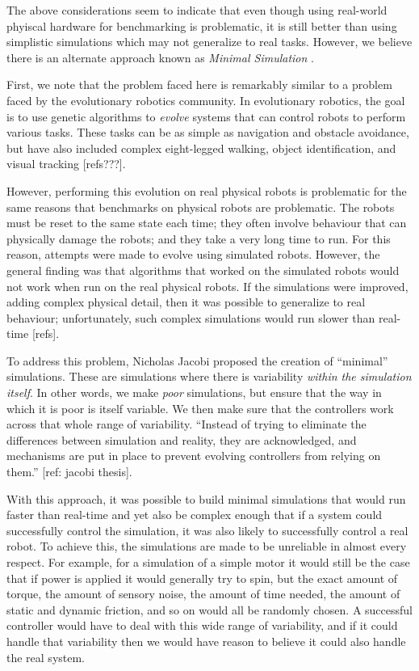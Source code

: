 \documentclass{frontiersSCNS} %
\begin{document}
The above considerations seem to indicate that even though using real-world
phyiscal hardware for benchmarking is problematic, it is still better than
using simplistic simulations which may not generalize to real tasks.  However,
we believe there is an alternate approach known as \emph{Minimal Simulation}
\cite{Jakobi97evolutionaryrobotics}.

First, we note that the problem faced here is remarkably similar to a problem
faced by the evolutionary robotics community.  In evolutionary robotics, the
goal is to use genetic algorithms to \emph{evolve} systems that can control
robots to perform various tasks.  These tasks can be as simple as navigation
and obstacle avoidance, but have also included complex eight-legged walking,
object identification, and visual tracking [refs???].

However, performing this evolution on real physical robots is problematic
for the same reasons that benchmarks on physical robots are problematic.  The
robots must be reset to the same state each time; they often involve
behaviour that can physically damage the robots; and they take a very long
time to run.  For this reason, attempts were made to evolve using simulated
robots.  However, the general finding was that algorithms that worked on the
simulated robots would not work when run on the real physical robots.  If
the simulations were improved, adding complex physical detail, then it was
possible to generalize to real behaviour; unfortunately, such complex
simulations would run slower than real-time [refs].

To address this problem, Nicholas Jacobi proposed the creation of
``minimal'' simulations.  These are simulations where there is variability
\emph{within the simulation itself}.  In other words, we make \emph{poor}
simulations, but ensure that the way in which it is poor is itself
variable.  We then make sure that the controllers work across that whole
range of variability.  ``Instead of trying to eliminate the differences between
simulation and reality, they are acknowledged, and mechanisms are put in place
to prevent evolving controllers from relying on them.'' [ref: jacobi thesis].

With this approach, it was possible to build minimal simulations that would
run faster than real-time and yet also be complex enough that if a system
could successfully control the simulation, it was also likely to successfully
control a real robot.  To achieve this, the simulations are made to be
unreliable in almost every respect.  For example, for a simulation of a simple
motor it would still be the case that if power is applied it would generally
try to spin, but the exact amount of torque, the amount of sensory noise,
the amount of time needed, the amount of static and dynamic friction, and so
on would all be randomly chosen.  A successful controller would have to deal
with this wide range of variability, and if it could handle that variability
then we would have reason to believe it could also handle the real system.
\end{document}
